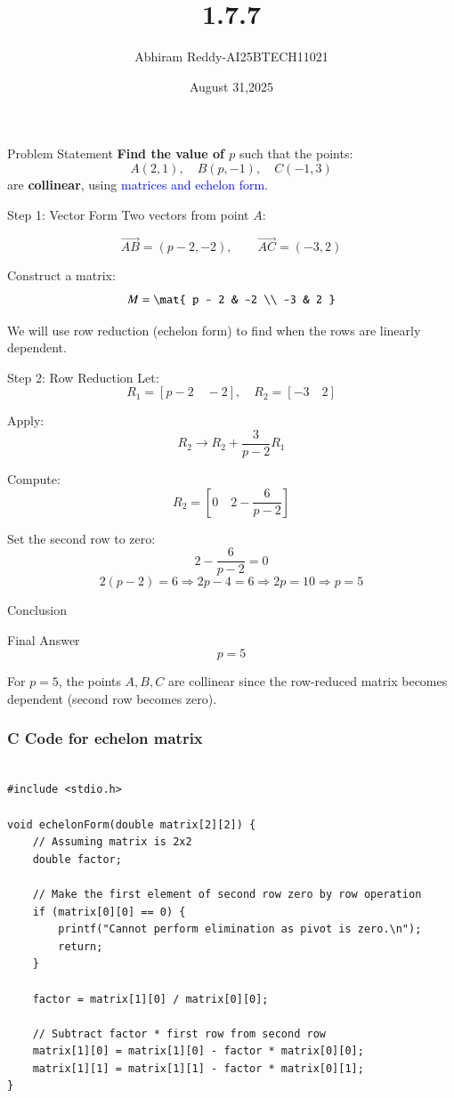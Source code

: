 \documentclass{beamer}
\title 
{1.7.7}
\date{August 31,2025}
\author 
{Abhiram Reddy-AI25BTECH11021}
\begin{document}
\frame{\titlepage}
\begin{frame}{Problem Statement}
\textbf{Find the value of \( p \)} such that the points:
\[
A(2,1), \quad B(p, -1), \quad C(-1,3)
\]
are \textbf{collinear}, using \textcolor{blue}{matrices and echelon form}.
\end{frame}

\begin{frame} {Step 1: Vector Form}
Two vectors from point \( A \):

\[
\overrightarrow{AB} = (p - 2, -2), \qquad \overrightarrow{AC} = (-3, 2)
\]

Construct a matrix:
\[
M = 
\mat{
p - 2 & -2 \\
-3 & 2
}
\]

We will use row reduction (echelon form) to find when the rows are linearly dependent.
\end{frame}

\begin{frame}{Step 2: Row Reduction}
Let:
\[
R_1 = [p - 2 \quad -2], \quad R_2 = [-3 \quad 2]
\]

Apply:
\[
R_2 \rightarrow R_2 + \frac{3}{p - 2} R_1
\]

Compute:
\[
R_2 = [0 \quad 2 - \frac{6}{p - 2}]
\]

Set the second row to zero:
\[
2 - \frac{6}{p - 2} = 0
\]
\[
2(p - 2) = 6 \Rightarrow 2p - 4 = 6 \Rightarrow 2p = 10 \Rightarrow \boxed{p = 5}
\]
\end{frame}

\begin{frame}{Conclusion}
\begin{block}{Final Answer}
\[
\boxed{p = 5}
\]
\end{block}

For \( p = 5 \), the points \( A, B, C \) are collinear since the row-reduced matrix becomes dependent (second row becomes zero).
\end{frame}


\begin{frame}[fragile]
    \frametitle{C Code for echelon matrix }

    \begin{lstlisting}

#include <stdio.h>

void echelonForm(double matrix[2][2]) {
    // Assuming matrix is 2x2
    double factor;

    // Make the first element of second row zero by row operation
    if (matrix[0][0] == 0) {
        printf("Cannot perform elimination as pivot is zero.\n");
        return;
    }
    
    factor = matrix[1][0] / matrix[0][0];

    // Subtract factor * first row from second row
    matrix[1][0] = matrix[1][0] - factor * matrix[0][0];
    matrix[1][1] = matrix[1][1] - factor * matrix[0][1];
}
\end{lstlisting}
\end{frame}
\end{document}
